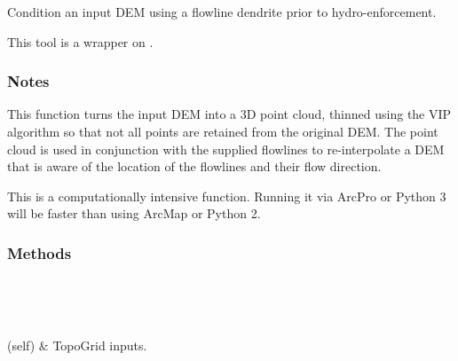 \documentclass[letterpaper,10pt,english]{sphinxmanual}
\begin{document}
\begin{fulllineitems}
\label{\detokenize{StreamStats_DataPrep:StreamStats_DataPrep.TopoGrid}}
Condition an input DEM using a flowline dendrite prior to hydro-enforcement.

This tool is a wrapper on {\hyperref[\detokenize{topo_grid:topo_grid.topogrid}]{}}.
\subsubsection*{Notes}

This function turns the input DEM into a 3D point cloud, thinned using the VIP algorithm so that not all points are retained from the original DEM. The point cloud is used in conjunction with the supplied flowlines to re-interpolate a DEM that is aware of the location of the flowlines and their flow direction.

This is a computationally intensive function. Running it via ArcPro or Python 3 will be faster than using ArcMap or Python 2.
\subsubsection*{Methods}


\begin{savenotes}\sphinxatlongtablestart\begin{longtable}{}
\hline

\endfirsthead

%
{}\\
\hline

\endhead

\hline
{}\\
\endfoot

\endlastfoot

{\hyperref[\detokenize{StreamStats_DataPrep:StreamStats_DataPrep.TopoGrid.getParameterInfo}]{}}(self)
&
TopoGrid inputs.
\\
\hline
\end{longtable}\sphinxatlongtableend\end{savenotes}


\end{fulllineitems}
\end{document}
